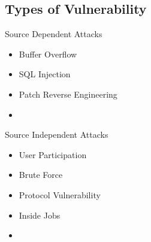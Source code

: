 \subsection{Types of Vulnerability}
\begin{frame}{Source Dependent Attacks}
    \begin{itemize}
      \item Buffer Overflow
      \item SQL Injection
      \item Patch Reverse Engineering
      \item\cite{clarke}
    \end{itemize}
\end{frame}

\begin{frame}{Source Independent Attacks}
  \begin{itemize}
    \item User Participation
    \item Brute Force
    \item Protocol Vulnerability
    \item Inside Jobs
    \item\cite{clarke}
  \end{itemize}
\end{frame}
